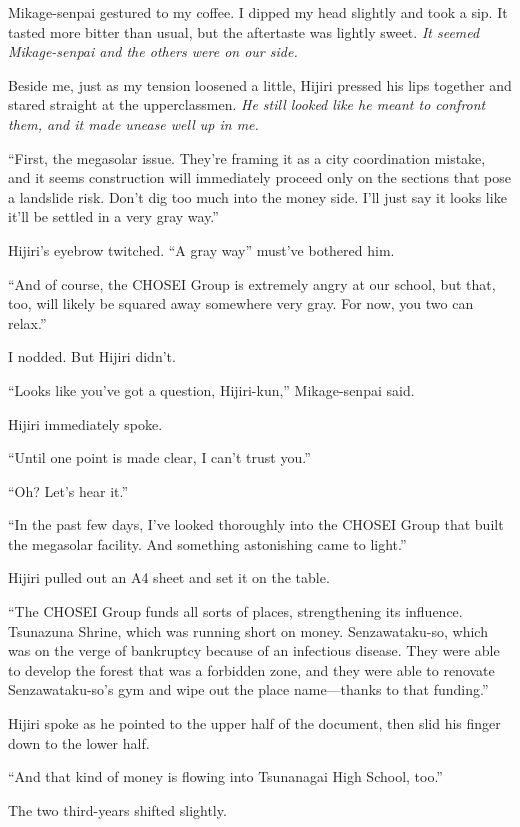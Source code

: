 \documentclass[
    a4paper,
    12pt,
    twoside,
    openany,
    UTF8,
    fontset=windows
]{ctexbook}
\begin{document}
Mikage-senpai gestured to my coffee. I dipped my head slightly and took a sip. It tasted more bitter than usual, but the aftertaste was lightly sweet. \textit{It seemed Mikage-senpai and the others were on our side.}

Beside me, just as my tension loosened a little, Hijiri pressed his lips together and stared straight at the upperclassmen. \textit{He still looked like he meant to confront them, and it made unease well up in me.}

``First, the megasolar issue. They're framing it as a city coordination mistake, and it seems construction will immediately proceed only on the sections that pose a landslide risk. Don't dig too much into the money side. I'll just say it looks like it'll be settled in a very gray way.''

Hijiri's eyebrow twitched. ``A gray way'' must've bothered him.

``And of course, the CHOSEI Group is extremely angry at our school, but that, too, will likely be squared away somewhere very gray. For now, you two can relax.''

I nodded. But Hijiri didn't.

``Looks like you've got a question, Hijiri-kun,'' Mikage-senpai said.

Hijiri immediately spoke.

``Until one point is made clear, I can't trust you.''

``Oh? Let's hear it.''

``In the past few days, I've looked thoroughly into the CHOSEI Group that built the megasolar facility. And something astonishing came to light.''

Hijiri pulled out an A4 sheet and set it on the table.

``The CHOSEI Group funds all sorts of places, strengthening its influence. Tsunazuna Shrine, which was running short on money. Senzawataku-so, which was on the verge of bankruptcy because of an infectious disease. They were able to develop the forest that was a forbidden zone, and they were able to renovate Senzawataku-so's gym and wipe out the place name---thanks to that funding.''

Hijiri spoke as he pointed to the upper half of the document, then slid his finger down to the lower half.

``And that kind of money is flowing into Tsunanagai High School, too.''

The two third-years shifted slightly.
\end{document}
